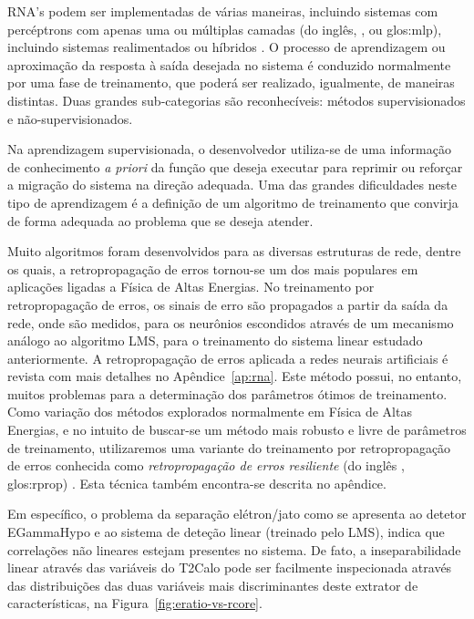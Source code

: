 RNA's podem ser implementadas de várias maneiras, incluindo sistemas com
percéptrons com apenas uma ou múltiplas camadas (do inglês, , ou \gls{glos:mlp}), incluindo sistemas realimentados ou híbridos
\cite{haykin}. O processo de aprendizagem ou aproximação da resposta à saída
desejada no sistema é conduzido normalmente por uma fase de treinamento, que
poderá ser realizado, igualmente, de maneiras distintas. Duas grandes
sub-categorias são reconhecíveis: métodos supervisionados e
não-supervisionados.

Na aprendizagem supervisionada, o desenvolvedor utiliza-se de uma informação
de conhecimento \textit{a priori} da função que deseja executar para reprimir
ou reforçar a migração do sistema na direção adequada. Uma das grandes
dificuldades neste tipo de aprendizagem é a definição de um algoritmo de
treinamento que convirja de forma adequada ao problema que se deseja atender.

Muito algoritmos foram desenvolvidos para as diversas estruturas de rede,
dentre os quais, a retropropagação de erros tornou-se um dos mais populares em
aplicações ligadas a Física de Altas Energias. No treinamento por
retropropagação de erros, os sinais de erro são propagados a partir da saída
da rede, onde são medidos, para os neurônios escondidos através de um
mecanismo análogo ao algoritmo LMS, para o treinamento do sistema linear
estudado anteriormente. A retropropagação de erros aplicada a redes neurais
artificiais é revista com mais detalhes no Apêndice~\ref{ap:rna}. Este método
possui, no entanto, muitos problemas para a determinação dos parâmetros ótimos
de treinamento. Como variação dos métodos explorados normalmente em Física de
Altas Energias, e no intuito de buscar-se um método mais robusto e livre de
parâmetros de treinamento, utilizaremos uma variante do treinamento por
retropropagação de erros conhecida como \textit{retropropagação de erros
resiliente} (do inglês , \gls{glos:rprop})
\cite{rprop}. Esta técnica também encontra-se descrita no apêndice.

Em específico, o problema da separação elétron/jato como se apresenta ao
detetor EGammaHypo e ao sistema de deteção linear (treinado pelo LMS), indica
que correlações não lineares estejam presentes no sistema. De fato, a
inseparabilidade linear através das variáveis do T2Calo pode ser facilmente
inspecionada através das distribuições das duas variáveis mais discriminantes
deste extrator de características, na Figura~\ref{fig:eratio-vs-rcore}.

